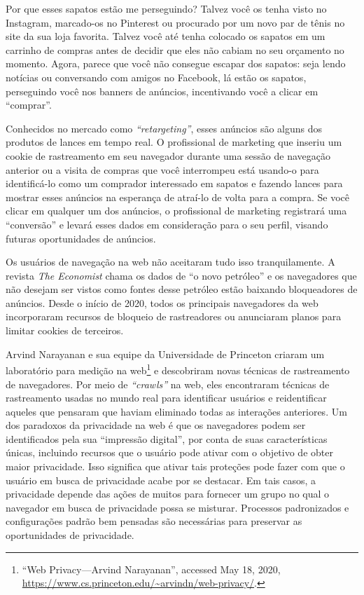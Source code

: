 \documentclass{book}
\newcommand{\ingles}[1]{\textit{#1}}
\begin{document}
Por que esses sapatos estão me perseguindo? Talvez você os tenha visto no Instagram,
marcado-os no Pinterest ou procurado por um novo par de tênis no site da sua loja
favorita. Talvez você até tenha colocado os sapatos em um carrinho de compras
antes de decidir que eles não cabiam no seu orçamento no momento. Agora, parece
que você não consegue escapar dos sapatos: seja lendo notícias ou conversando
com amigos no Facebook, lá estão os sapatos, perseguindo você nos banners de
anúncios, incentivando você a clicar em ``comprar''.

Conhecidos no mercado como \ingles{``retargeting''}, esses anúncios são alguns
dos produtos de lances em tempo real. O profissional de marketing que inseriu
um cookie de rastreamento em seu navegador durante uma sessão de navegação
anterior ou a visita de compras que você interrompeu está usando-o para
identificá-lo como um comprador interessado em sapatos e fazendo lances para
mostrar esses anúncios na esperança de atraí-lo de volta para a compra. Se
você clicar em qualquer um dos anúncios, o profissional de marketing
registrará uma ``conversão'' e levará esses dados em consideração para o seu
perfil, visando futuras oportunidades de anúncios.

Os usuários de navegação na web não aceitaram tudo isso tranquilamente. A
revista \ingles{The Economist} chama os dados de ``o novo petróleo'' e os
navegadores que não desejam ser vistos como fontes desse petróleo estão
baixando bloqueadores de anúncios. Desde o início de 2020, todos os
principais navegadores da web incorporaram recursos de bloqueio de
rastreadores ou anunciaram planos para limitar cookies de terceiros.

Arvind Narayanan e sua equipe da Universidade de Princeton criaram um
laboratório para medição na web\footnote{``Web Privacy—Arvind Narayanan'',
accessed May 18, 2020,
\url{https://www.cs.princeton.edu/~arvindn/web-privacy/}.} e descobriram novas
técnicas de rastreamento de navegadores. Por meio de \ingles{``crawls''} na
web, eles encontraram técnicas de rastreamento usadas no mundo real para
identificar usuários e reidentificar aqueles que pensaram que haviam eliminado
todas as interações anteriores. Um dos paradoxos da privacidade na web é que
os navegadores podem ser identificados pela sua ``impressão digital'', por
conta de suas características únicas, incluindo recursos que o usuário pode
ativar com o objetivo de obter maior privacidade. Isso significa que ativar
tais proteções pode fazer com que o usuário em busca de privacidade acabe por
se destacar. Em tais casos, a privacidade depende das ações de muitos para
fornecer um grupo no qual o navegador em busca de privacidade possa se misturar.
Processos padronizados e configurações padrão bem pensadas são necessárias
para preservar as oportunidades de privacidade.
\end{document}
